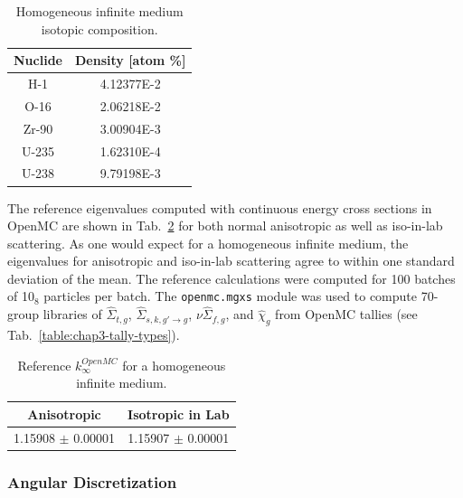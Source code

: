 \begin{table}[h!]
  \centering
  \caption[Infinite medium isotopic composition]{Homogeneous infinite medium isotopic composition.}
  \small
  \label{table:chap5-inf-med-isotopes} 
  \vspace{6pt}
  \begin{tabular}{c c}
  \toprule
  \rowcolor{lightgray}
  {\bf Nuclide} &
  {\bf Density [atom \%]} \\
  \midrule
  H-1 &   4.12377E-2 \\
  O-16 &  2.06218E-2 \\
  Zr-90 & 3.00904E-3 \\
  U-235 & 1.62310E-4 \\
  U-238 & 9.79198E-3 \\
  \bottomrule
\end{tabular}
\end{table}

The reference eigenvalues computed with continuous energy cross sections in OpenMC are shown in Tab.~\ref{table:chap5-inf-med-reference} for both normal anisotropic as well as iso-in-lab scattering. As one would expect for a homogeneous infinite medium, the eigenvalues for anisotropic and iso-in-lab scattering agree to within one standard deviation of the mean. The reference calculations were computed for 100 batches of 10$_{8}$ particles per batch. The \texttt{openmc.mgxs} module was used to compute 70-group libraries of $\hat{\Sigma}_{t,g}$, $\hat{\Sigma}_{s,k,g'\rightarrow g}$, $\nu\hat{\Sigma}_{f,g}$, and $\hat{\chi}_{g}$ from OpenMC tallies (see Tab.~\ref{table:chap3-tally-types}).

\begin{table}[h!]
  \centering
  \caption[Reference $k^{OpenMC}_{\infty}$ for an infinite medium]{Reference $k^{OpenMC}_{\infty}$ for a homogeneous infinite medium.}
  \small
  \label{table:chap5-inf-med-reference} 
  \vspace{6pt}
  \begin{tabular}{c c}
  \toprule
  \rowcolor{lightgray}
  {\cellcolor{carolinablue} {\bf Anisotropic}} &
  {\cellcolor{lightgreen} {\bf Isotropic in Lab}} \\
  \midrule
  1.15908 $\pm$ 0.00001 & 1.15907 $\pm$ 0.00001 \\
  \bottomrule
\end{tabular}
\end{table}

\subsubsection{Angular Discretization}
\label{subsubsec:chap5-inf-med-angle}


